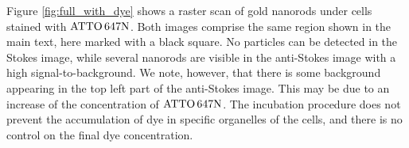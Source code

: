 Figure \ref{fig:full_with_dye} shows a raster scan of gold nanorods under cells
stained with $\textrm{ATTO}\,647\textrm{N}$. Both images comprise the same region shown in the main
text, here marked with a black square. No particles can be detected in the
Stokes image, while several nanorods are visible in the anti-Stokes image with a
high signal-to-background. We note, however, that there is some
background appearing in the top left part of the anti-Stokes image. This may be
due to an increase of the concentration of $\textrm{ATTO}\,647\textrm{N}$. The incubation procedure does
not prevent the accumulation of dye in specific organelles of the cells, and
there is no control on the final dye concentration. 